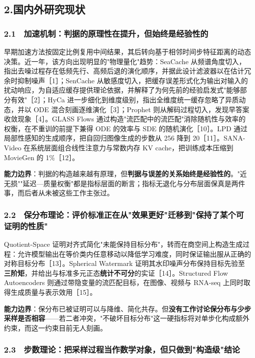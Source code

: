 \documentclass[12pt,a4paper]{ctexart}
\begin{document}
\subsection*{2.国内外研究现状}

\subsubsection*{2.1　加速机制：判据的原理性在提升，但始终是经验性的}

早期加速方法按固定比例复用中间结果，其后转向基于相邻时间步特征距离的动态决策。近一年，该方向出现明显的"物理量化"趋势：SeaCache 从频谱角度切入，指出去噪过程存在低频先行、高频后退的演化顺序，并据此设计滤波器以在估计冗余时抑制噪声［1］；SenCache 从敏感度切入，把缓存误差形式化为输出对输入的扰动响应，为自适应缓存提供理论依据，并解释了为何先前的经验启发式"能够部分有效"［2］；HyCa 进一步细化到维度级别，指出全维度统一缓存忽略了异质动态，并以 ODE 混合刻画逐维演化［3］；Prophet 则从解码过程切入，发现早答案收敛现象［4］。GLASS Flows 通过构造"流匹配中的流匹配"消除随机性与效率的权衡，在不重训的前提下兼得 ODE 的效率与 SDE 的随机演化［10］。LPD 通过局部性感知的生成顺序，把自回归图像生成的步数从 256 降到 20［11］。SANA-Video 在系统层面组合线性注意力与常数内存 KV cache，把训练成本压缩到 MovieGen 的 1\%［12］。

\textbf{能力边界}：判据的构造越来越有原理，但\textbf{判据与误差的关系始终是经验性的}。"近无损""延迟—质量权衡"都是指标层面的断言；指标无退化与分布层面保真是两件事，而后者从未被这些工作主张过。

\subsubsection*{2.2　保分布理论：评价标准正在从"效果更好"迁移到"保持了某个可证明的性质"}

Quotient-Space 证明对齐式简化"未能保持目标分布"，转而在商空间上构造生成过程：允许模型输出在等价类内任意移动以降低学习难度，同时保证输出服从正确的对称目标分布［13］。Spherical Watermark 证明其水印噪声分布保持目标先验至\textbf{三阶矩}，并给出与标准多元正态\textbf{统计不可分}的实证［14］。Structured Flow Autoencoders 则通过带隐变量的流匹配目标，在图像、视频与 RNA-seq 上同时取得生成质量与表示效用［15］。

\textbf{能力边界}：保分布已被证明可以与降维、简化共存。但\textbf{没有工作讨论保分布与少步采样是否相容}——若二者冲突，"不破坏目标分布"这一硬指标将对单步化构成额外约束，而这一约束目前无人刻画。

\subsubsection*{2.3　步数理论：把采样过程当作数学对象，但只做到"构造级"结论}
\end{document}
